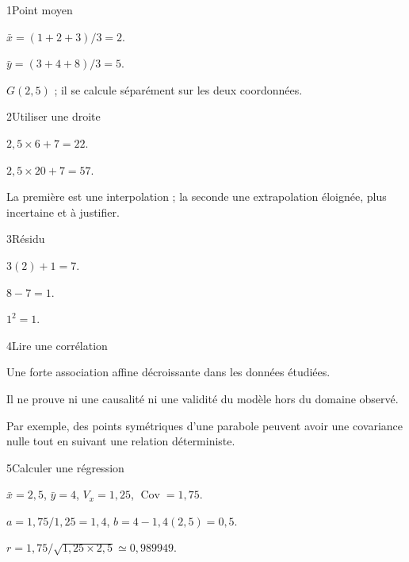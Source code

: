 \begin{corrige}{1}{Point moyen}
\begin{questions}
\item $\bar x=(1+2+3)/3=2$.
\item $\bar y=(3+4+8)/3=5$.
\item $G(2,5)$ ; il se calcule séparément sur les deux coordonnées.
\end{questions}
\end{corrige}
\begin{corrige}{2}{Utiliser une droite}
\begin{questions}
\item $2{,}5\times6+7=22$.
\item $2{,}5\times20+7=57$.
\item La première est une interpolation ; la seconde une extrapolation éloignée, plus incertaine et à justifier.
\end{questions}
\end{corrige}
\begin{corrige}{3}{Résidu}
\begin{questions}
\item $3(2)+1=7$.
\item $8-7=1$.
\item $1^2=1$.
\end{questions}
\end{corrige}
\begin{corrige}{4}{Lire une corrélation}
\begin{questions}
\item Une forte association affine décroissante dans les données étudiées.
\item Il ne prouve ni une causalité ni une validité du modèle hors du domaine observé.
\item Par exemple, des points symétriques d’une parabole peuvent avoir une covariance nulle tout en suivant une relation déterministe.
\end{questions}
\end{corrige}
\begin{corrige}{5}{Calculer une régression}
\begin{questions}
\item $\bar x=2{,}5$, $\bar y=4$, $V_x=1{,}25$, $\operatorname{Cov}=1{,}75$.
\item $a=1{,}75/1{,}25=1{,}4$, $b=4-1{,}4(2{,}5)=0{,}5$.
\item $r=1{,}75/\sqrt{1{,}25\times2{,}5}\simeq0{,}989949$.
\end{questions}
\end{corrige}
